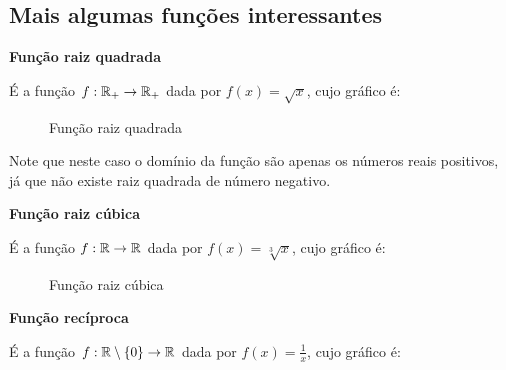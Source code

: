   \subsection{Mais algumas funções interessantes}

  \textbf{Função raiz quadrada}

  É a função $f: \mathbb{R}_{+} \to \mathbb{R}_{+}$ dada por $f(x)= \sqrt{x}$, cujo gráfico é:

   \begin{figure}[H]
 \centering
    \caption{Função raiz quadrada}
  \end{figure}

  Note que neste caso o domínio da função são apenas os números reais positivos, já que não existe raiz quadrada de número negativo.

  \newpage
  \textbf{Função raiz cúbica}

  É a função $f: \mathbb{R} \to \mathbb{R}$ dada por $f(x)= \sqrt[3]{x}$, cujo gráfico é:

   \begin{figure}[H]
 \centering
    \caption{Função raiz cúbica}
  \end{figure}

  \textbf{Função recíproca}

  É a função $f: \mathbb{R} \setminus \{0\} \to \mathbb{R}$ dada por $f(x)= \frac{1}{x}$, cujo gráfico é:


